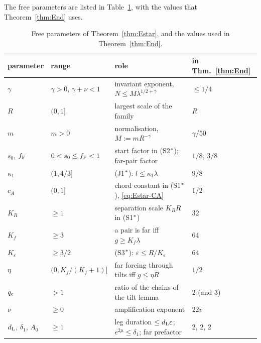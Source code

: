 The free parameters are listed in Table~\ref{tab:Estar-par}, with the values that Theorem~\ref{thm:End} uses.

\begin{table}[htbp]
\centering\small
\begin{tabular}{@{}llp{6.3cm}l@{}}
\toprule
parameter & range & role & in Thm.~\ref{thm:End}\\
\midrule
$\gamma$ & $\gamma>0$, $\gamma+\nu<1$ & invariant exponent, $N\le M\lambda^{1/2+\gamma}$ & $\le1/4$\\
$R$ & $(0,1]$ & largest scale of the family & $R$\\
$m$ & $m>0$ & normalisation, $M:=mR^{-\gamma}$ & $\gamma/50$\\
$s_0$, $f_{\mathrm F}$ & $0<s_0\le f_{\mathrm F}<1$ & start factor in (S2$^{*}$); far-pair factor & $1/8$, $3/8$\\
$\kappa_1$ & $(1,4/3]$ & (J1$^{*}$): $l\le\kappa_1\lambda$ & $9/8$\\
$c_A$ & $(0,1]$ & chord constant in (S1$^{*}$), \eqref{eq:Estar-CA} & $1/2$\\
$K_R$ & $\ge1$ & separation scale $K_RR$ in (S1$^{*}$) & $32$\\
$K_f$ & $\ge3$ & a pair is far iff $g\ge K_f\lambda$ & $64$\\
$K_\varepsilon$ & $\ge3/2$ & (S3$^{*}$): $\varepsilon\le R/K_\varepsilon$ & $64$\\
$\eta$ & $(0,K_f/(K_f+1)]$ & far forcing through tilts iff $g\le\eta R$ & $1/2$\\
$q_{\mathrm c}$ & $>1$ & ratio of the chains of the tilt lemma & $2$ (and $3$)\\
$\nu$ & $\ge0$ & amplification exponent & $22v$\\
$d_{\mathrm L}$, $\delta_1$, $A_0$ & $\ge1$ & leg duration $\le d_{\mathrm L}\varepsilon$; $e^{2\mu}\le\delta_1$; far prefactor & $2$, $2$, $2$\\
\bottomrule
\end{tabular}
\caption{Free parameters of Theorem~\ref{thm:Estar}, and the values used in Theorem~\ref{thm:End}.}\label{tab:Estar-par}
\end{table}

